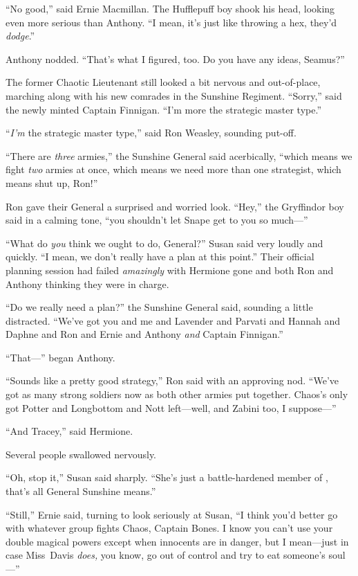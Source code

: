 “No good,” said Ernie Macmillan. The Hufflepuff boy shook his head, looking
even more serious than Anthony. “I mean, it’s just like throwing a hex, they’d
\emph{dodge}.”

Anthony nodded. “That’s what I figured, too. Do you have any ideas, Seamus?”

The former Chaotic Lieutenant still looked a bit nervous and out-of-place,
marching along with his new comrades in the Sunshine Regiment. “Sorry,” said
the newly minted Captain Finnigan. “I’m more the strategic master type.”

“\emph{I’m} the strategic master type,” said Ron Weasley, sounding put-off.

“There are \emph{three} armies,” the Sunshine General said acerbically, “which
means we fight \emph{two} armies at once, which means we need more than one
strategist, which means shut up, Ron!”

Ron gave their General a surprised and worried look. “Hey,” the Gryffindor boy
said in a calming tone, “you shouldn’t let Snape get to you so much—”

“What do \emph{you} think we ought to do, General?” Susan said very loudly and
quickly. “I mean, we don’t really have a plan at this point.” Their official
planning session had failed \emph{amazingly} with Hermione gone and both Ron
and Anthony thinking they were in charge.

“Do we really need a plan?” the Sunshine General said, sounding a little
distracted. “We’ve got you and me and Lavender and Parvati and Hannah and
Daphne and Ron and Ernie and Anthony \emph{and} Captain Finnigan.”

“That—” began Anthony.

“Sounds like a pretty good strategy,” Ron said with an approving nod. “We’ve
got as many strong soldiers now as both other armies put together. Chaos’s only
got Potter and Longbottom and Nott left—well, and Zabini too, I suppose—”

“And Tracey,” said Hermione.

Several people swallowed nervously.

“Oh, stop it,” Susan said sharply. “She’s just a battle-hardened member of
\SPHEW, that’s all General Sunshine means.”

“Still,” Ernie said, turning to look seriously at Susan, “I think you’d better
go with whatever group fights Chaos, Captain Bones. I know you can’t use your
double magical powers except when innocents are in danger, but I mean—just in
case Miss~Davis \emph{does,} you know, go out of control and try to eat
someone’s soul—”

